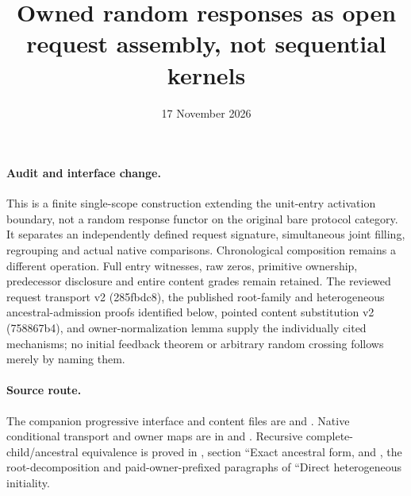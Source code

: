 \documentclass[11pt]{article}
\title{Owned random responses as open request assembly, not sequential kernels}
\date{17 November 2026}
\begin{document}
\maketitle
\paragraph{Audit and interface change.}
This is a finite single-scope construction extending the unit-entry activation boundary, not a random response functor on the original bare protocol category. It separates an independently defined request signature, simultaneous joint filling, regrouping and actual native comparisons. Chronological composition remains a different operation. Full entry witnesses, raw zeros, primitive ownership, predecessor disclosure and entire content grades remain retained. The reviewed request transport v2 (285fbdc8), the published root-family and heterogeneous ancestral-admission proofs identified below, pointed content substitution v2 (758867b4), and owner-normalization lemma supply the individually cited mechanisms; no initial feedback theorem or arbitrary random crossing follows merely by naming them.

\paragraph{Source route.} The companion progressive interface and content files are \texttt{} and \texttt{}. Native conditional transport and owner maps are in \texttt{} and \texttt{}. Recursive complete-child/ancestral equivalence is proved in \texttt{}, section ``Exact ancestral form, and \texttt{}, the root-decomposition and paid-owner-prefixed paragraphs of ``Direct heterogeneous initiality.
\end{document}
